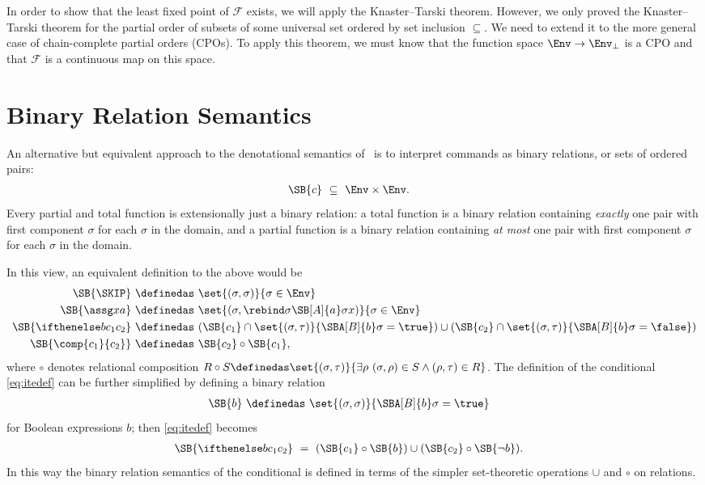 In order to show that the least fixed point of $\mathcal F$ exists, we will apply the Knaster--Tarski theorem.  However, we only proved the Knaster--Tarski theorem for the partial order of subsets of some universal set ordered by set inclusion $\subseteq$.  We need to extend it to the more general case of chain-complete partial orders (CPOs).  To apply this theorem, we must know that the function space $\Env\to\Env_\bot$ is a CPO and that $\mathcal F$ is a continuous map on this space.

\section{Binary Relation Semantics}

An alternative but equivalent approach to the denotational semantics of \IMP\ is to interpret commands as binary relations, or sets of ordered pairs:
\begin{align*}
\SB{c}\ &\subseteq\ \Env\times\Env.
\end{align*}
Every partial and total function is extensionally just a binary relation: a total function is a binary relation containing \emph{exactly} one pair with first component $\sigma$ for each $\sigma$ in the domain, and a partial function is a binary relation containing \emph{at most} one pair with first component $\sigma$ for each $\sigma$ in the domain.

In this view, an equivalent definition to the above would be
\begin{align}
\SB{\SKIP}\ &\definedas\ \set{(\sigma,\sigma)}{\sigma\in\Env}\nonumber\\
\SB{\assg xa}\ &\definedas\ \set{(\sigma,\rebind\sigma{\SB[A]{a}\sigma}x)}{\sigma\in\Env}\nonumber\\
\SB{\ifthenelse b{c_1}{c_2}}\ &\definedas\ (\SB{c_1}\cap\set{(\sigma,\tau)}{\SBA[B]{b}\sigma = \true})\cup(\SB{c_2}\cap\set{(\sigma,\tau)}{\SBA[B]{b}\sigma = \false})\label{eq:itedef}\\
\SB{\comp{c_1}{c_2}}\ &\definedas\ \SB{c_2}\circ\SB{c_1},\nonumber
\end{align}
where $\circ$ denotes relational composition $R\circ S \definedas \set{(\sigma,\tau)}{\exists\rho\ (\sigma,\rho)\in S\wedge (\rho,\tau)\in R}$. The definition of the conditional \eqref{eq:itedef} can be further simplified by defining a binary relation
\begin{align*}
\SB{b}\ &\definedas\ \set{(\sigma,\sigma)}{\SBA[B]{b}\sigma = \true}
\end{align*}
for Boolean expressions $b$; then \eqref{eq:itedef} becomes
\begin{align}
\SB{\ifthenelse b{c_1}{c_2}}\ &=\ (\SB{c_1}\circ\SB{b}) \cup (\SB{c_2}\circ\SB{\neg b}).\label{eq:ifdef}
\end{align}
In this way the binary relation semantics of the conditional is defined in terms of the simpler set-theoretic operations $\cup$ and $\circ$ on relations.


